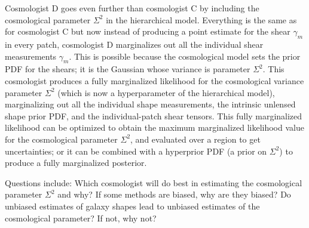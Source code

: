 \documentclass[12pt]{article}
\begin{document}
Cosmologist D goes even further than cosmologist C by including the
cosmological parameter $\Sigma^2$ in the hierarchical model.
Everything is the same as for cosmologist C but now instead of
producing a point estimate for the shear $\gamma_m$ in every patch,
cosmologist D marginalizes out all the individual shear measurements
$\gamma_m$.  This is possible because the cosmological model sets the
prior PDF for the shears; it is the Gaussian whose variance is
parameter $\Sigma^2$.  This cosmologist produces a fully marginalized
likelihood for the cosmological variance parameter $\Sigma^2$ (which
is now a hyperparameter of the hierarchical model), marginalizing out
all the individual shape measurements, the intrinsic unlensed shape
prior PDF, and the individual-patch shear tensors.  This fully
marginalized likelihood can be optimized to obtain the maximum
marginalized likelihood value for the cosmological parameter
$\Sigma^2$, and evaluated over a region to get uncertainties; or it
can be combined with a hyperprior PDF (a prior on $\Sigma^2$) to
produce a fully marginalized posterior.

Questions include: Which cosmologist will do best in estimating the
cosmological parameter $\Sigma^2$ and why?  If some methods are
biased, why are they biased?  Do unbiased estimates of galaxy shapes
lead to unbiased estimates of the cosmological parameter?  If not, why
not?
\end{document}
